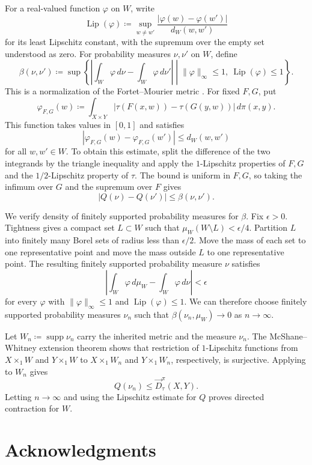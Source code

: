 \documentclass[11pt]{amsart}
\theoremstyle{plain}
\theoremstyle{definition}
\theoremstyle{remark}
\DeclareMathOperator{\supp}{supp}
\begin{document}
For a real-valued function $\varphi$ on $W$, write
\[
\operatorname{Lip}(\varphi)\coloneqq\sup_{w\neq w'}\frac{|\varphi(w)-\varphi(w')|}{d_W(w,w')}
\]
for its least Lipschitz constant, with the supremum over the empty set understood as zero. For probability measures $\nu,\nu'$ on $W$, define
\[
\beta(\nu,\nu')\coloneqq\sup\left\{\left|\int_W\varphi\,d\nu-\int_W\varphi\,d\nu'\right|\mathrel{}\middle|\mathrel{}\|\varphi\|_\infty\leq1,\ \operatorname{Lip}(\varphi)\leq1\right\}.
\]
This is a normalization of the Fortet--Mourier metric \cite[Equation~(3), p.~2]{hille-theewis2023boundedlipschitz}. For fixed $F,G$, put
\[
\varphi_{F,G}(w)\coloneqq\int_{X\times Y}|\tau(F(x,w))-\tau(G(y,w))|\,d\pi(x,y).
\]
This function takes values in $[0,1]$ and satisfies
\[
|\varphi_{F,G}(w)-\varphi_{F,G}(w')|\leq d_W(w,w')
\]
for all $w,w'\in W$. To obtain this estimate, split the difference of the two integrands by the triangle inequality and apply the $1$-Lipschitz properties of $F,G$ and the $1/2$-Lipschitz property of $\tau$. The bound is uniform in $F,G$, so taking the infimum over $G$ and the supremum over $F$ gives
\[
|Q(\nu)-Q(\nu')|\leq\beta(\nu,\nu').
\]

We verify density of finitely supported probability measures for $\beta$. Fix $\epsilon>0$. Tightness gives a compact set $L\subset W$ such that $\mu_W(W\setminus L)<\epsilon/4$. Partition $L$ into finitely many Borel sets of radius less than $\epsilon/2$. Move the mass of each set to one representative point and move the mass outside $L$ to one representative point. The resulting finitely supported probability measure $\nu$ satisfies
\[
\left|\int_W\varphi\,d\mu_W-\int_W\varphi\,d\nu\right|<\epsilon
\]
for every $\varphi$ with $\|\varphi\|_\infty\leq1$ and $\operatorname{Lip}(\varphi)\leq1$. We can therefore choose finitely supported probability measures $\nu_n$ such that $\beta(\nu_n,\mu_W)\to0$ as $n\to\infty$.

Let $W_n\coloneqq\supp\nu_n$ carry the inherited metric and the measure $\nu_n$. The McShane--Whitney extension theorem \cite[Proposition~1.1]{esaki-kazukawa-mitsuishi2024invariants} shows that restriction of $1$-Lipschitz functions from $X\times_1W$ and $Y\times_1W$ to $X\times_1W_n$ and $Y\times_1W_n$, respectively, is surjective. Applying  to $W_n$ gives
\[
Q(\nu_n)\leq\overrightarrow D_\tau^\pi(X,Y).
\]
Letting $n\to\infty$ and using the Lipschitz estimate for $Q$ proves directed contraction for $W$.

\section*{Acknowledgments}
\end{document}

